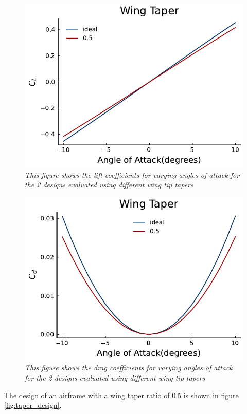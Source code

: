 \documentclass{journal}
\begin{document}
	\begin{figure}[H]
		\includegraphics{../graphics/taper_cl.pdf}
		\caption{\emph{This figure shows the lift coefficients for varying angles of attack for the 2 designs evaluated using different wing tip tapers}}
		\label{fig:taper_cl}
	\end{figure}
	\begin{figure}[H]
		\includegraphics{../graphics/taper_cd.pdf}
		\caption{\emph{This figure shows the drag coefficients for varying angles of attack for the 2 designs evaluated using different wing tip tapers}}
		\label{fig:taper_cd}
	\end{figure}
	
	The design of an airframe with a wing taper ratio of 0.5 is shown in figure \ref{fig:taper_design}.
	
\end{document}
